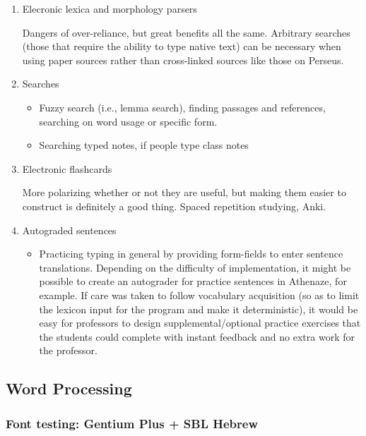 \documentclass[11pt]{article}
\begin{document}
\begin{enumerate}
\item Elecronic lexica and morphology parsers
\label{sec:org95a4e34}

Dangers of over-reliance, but great benefits all the same. Arbitrary searches (those that require the ability to type native text) can be necessary when using paper sources rather than cross-linked sources like those on Perseus.

\item Searches
\label{sec:orgbcfa266}

\begin{itemize}
\item Fuzzy search (i.e., lemma search), finding passages and references, searching on word usage or specific form.
\item Searching typed notes, if people type class notes
\end{itemize}

\item Electronic flashcards
\label{sec:org0345118}

More polarizing whether or not they are useful, but making them easier to construct is definitely a good thing. Spaced repetition studying, Anki.

\item Autograded sentences
\label{sec:org59d37ea}

\begin{itemize}
\item Practicing typing in general by providing form-fields to enter sentence translations. Depending on the difficulty of implementation, it might be possible to create an autograder for practice sentences in Athenaze, for example. If care was taken to follow vocabulary acquisition (so as to limit the lexicon input for the program and make it deterministic), it would be easy for professors to design supplemental/optional practice exercises that the students could complete with instant feedback and no extra work for the professor.
\end{itemize}
\end{enumerate}

\subsection{Word Processing}
\label{sec:org8650f88}

\subsubsection{Font testing: Gentium Plus + SBL Hebrew}
\label{sec:orgd0f697d}
\end{document}
